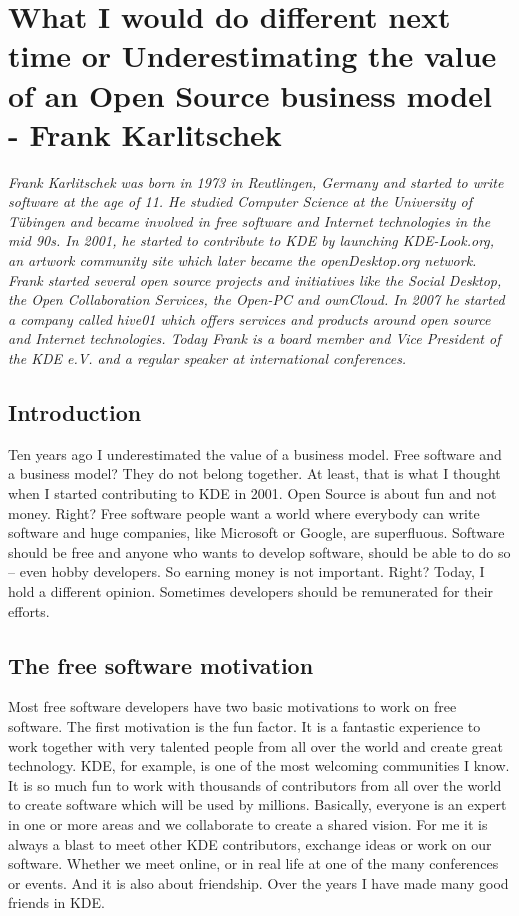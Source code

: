 \chapter{What I would do different next time or Underestimating the value of an
Open Source business model - Frank Karlitschek}

\textit{Frank Karlitschek was born in 1973 in Reutlingen, Germany and started to
write software at the age of 11. He studied Computer Science at the University
of T\"ubingen and became involved in free software and Internet technologies in
the mid 90s. In 2001, he started to contribute to KDE by launching KDE-Look.org,
an artwork community site which later became the openDesktop.org network. Frank
started several open source projects and initiatives like the Social Desktop,
the Open Collaboration Services, the Open-PC and ownCloud. In 2007 he started a
company called hive01 which offers services and products around open source and
Internet technologies.
Today Frank is a board member and Vice President of the KDE e.V. and a regular
speaker at international conferences.}

\section*{Introduction}

Ten years ago I underestimated the value of a business model. Free software and
a business model? They do not belong together. At least, that is what I thought
when I started contributing to KDE in 2001. Open Source is about fun and not
money. Right? Free software people want a world where everybody can write
software and huge companies, like Microsoft or Google, are superfluous. Software
should be free and anyone who wants to develop software, should be able to do so
-- even hobby developers. So earning money is not important. Right? Today, I
hold a different opinion. Sometimes developers should be remunerated for their
efforts.  

\section*{The free software motivation}

Most free software developers have two basic motivations to work on free
software. The first motivation is the fun factor. It is a fantastic experience
to work together with very talented people from all over the world and create
great technology. KDE, for example, is one of the most welcoming communities I
know. It is so much fun to work with thousands of contributors from all over the
world to create software which will be used by millions. Basically, everyone is
an expert in one or more areas and we collaborate to create a shared vision. For
me it is always a blast to meet other KDE contributors, exchange ideas or work
on our software. Whether we meet online, or in real life at one of the many
conferences or events. And it is also about friendship. Over the years I have
made many good friends in KDE.

